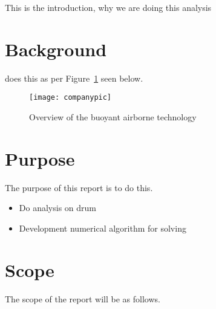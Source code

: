 \label{chapt:intro}

This is the introduction, why we are doing this analysis

\section{Background} %

\Company does this as per Figure~\ref{fig:companypic} seen below.

\begin{figure}[H]
    \centering
    \texttt{[image: companypic]}
    \caption{Overview of the buoyant airborne technology \citep{companypicweb}}
    \label{fig:companypic}
\end{figure}


\section{Purpose}
The purpose of this report is to do this.
\begin{itemize}
    \item Do analysis on drum
    \item Development numerical algorithm for solving
\end{itemize}


\section{Scope} %

The scope of the report will be as follows.

